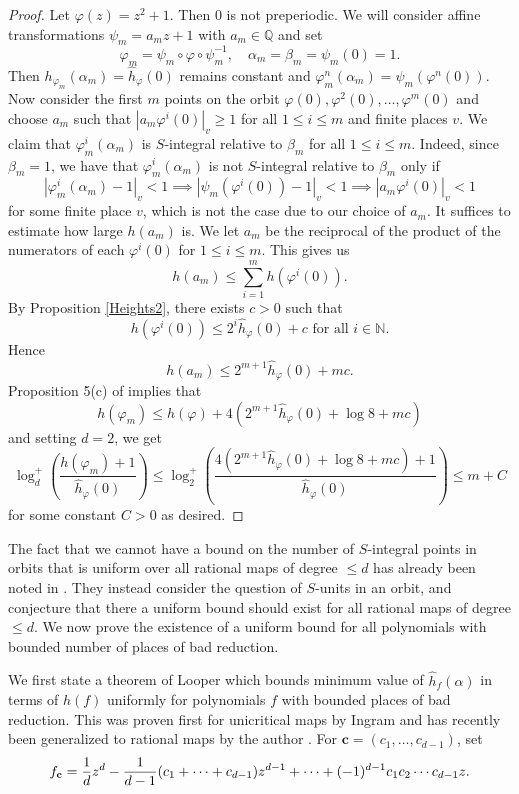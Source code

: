 \documentclass[10pt, reqno]{amsart}
\newcommand{\bb}{\mathbb}
\newcommand{\vphi}{\varphi}
\newcommand{\h}{\widehat{h}}
\numberwithin{theorem}{section}
\numberwithin{equation}{section}
\numberwithin{example}{section}
\numberwithin{definition}{section}
\begin{document}
\begin{proof}
Let $\vphi(z) = z^2+1$. Then $0$ is not preperiodic. We will consider affine transformations $\psi_m = a_m z + 1$ with $a_m \in \bb{Q}$ and set 
$$\vphi_m = \psi_m \circ \vphi \circ  \psi_m^{-1}, \quad \alpha_m = \beta_m = \psi_m(0) = 1.$$
Then $h_{\vphi_m}(\alpha_m) = \h_{\vphi}(0)$ remains constant and $\vphi_m^n(\alpha_m) = \psi_m( \vphi^n(0))$. Now consider the first $m$ points on the orbit $\vphi(0),\vphi^2(0),\ldots,\vphi^m(0)$ and choose $a_m$ such that $|a_m \vphi^i(0)|_v \geq 1$ for all $1 \leq i \leq m$ and finite places $v$. We claim that $\vphi_m^i(\alpha_m)$ is $S$-integral relative to $\beta_m$ for all $1 \leq i \leq m$. Indeed, since $\beta_m = 1$, we have that $\vphi_m^i(\alpha_m)$ is not $S$-integral relative to $\beta_m$ only if 
$$|\vphi_m^i(\alpha_m) - 1|_v < 1 \implies |\psi_m(\vphi^i(0)) - 1|_v < 1 \implies |a_m \vphi^i(0)|_v < 1$$
for some finite place $v$, which is not the case due to our choice of $a_m$. It suffices to estimate how large $h(a_m)$ is. We let $a_m$ be the reciprocal of the product of the numerators of each $\vphi^i(0)$ for $1 \leq i \leq m$. This gives us
$$h(a_m) \leq \sum_{i=1}^{m} h(\vphi^i(0)).$$
By Proposition \ref{Heights2}, there exists $c > 0$ such that
$$h(\vphi^i(0)) \leq 2^i \h_{\vphi}(0) + c \text{ for all } i \in \bb{N}.$$
Hence
$$h(a_m) \leq 2^{m+1} \h_{\vphi}(0) + mc.$$
Proposition 5(c) of \cite{HS11} implies that 
$$h(\vphi_m) \leq h(\vphi) + 4(2^{m+1} \h_{\vphi}(0) + \log 8 + mc)$$
and setting $d = 2$, we get
$$\log_d^+ \left( \frac{h(\vphi_m) + 1}{\h_{\vphi}(0)} \right) \leq \log_2^+ \left( \frac{ 4(2^{m+1} \h_{\vphi}(0) + \log 8 + mc)+1}{\h_{\vphi}(0)} \right) \leq m+C $$
for some constant $C > 0$ as desired. 


\end{proof}

The fact that we cannot have a bound on the number of $S$-integral points in orbits that is uniform over all rational maps of degree $\leq d$ has already been noted in \cite{KLS15}. They instead consider the question of $S$-units in an orbit, and conjecture that there a uniform bound should exist for all rational maps of degree $\leq d$. We now prove the existence of a uniform bound for all polynomials with bounded number of places of bad reduction. 
\par 
We first state a theorem of Looper which bounds minimum value of $\h_{f}(\alpha)$ in terms of $h(f)$ uniformly for polynomials $f$ with bounded places of bad reduction. This was proven first for unicritical maps by Ingram \cite{Ing09b} and has recently been generalized to rational maps by the author \cite{Yap25b}. For $\mathbf{c} = (c_1,\ldots,c_{d-1})$, set
$$f_{\bf{c}} = \frac{1}{d} z^d - \frac{1}{d-1} (c_1 + \cdots + c_{d-1})z^{d-1} + \cdots + (-1)^{d-1}c_1 c_2 \cdots c_{d-1}z.$$
\end{document}

